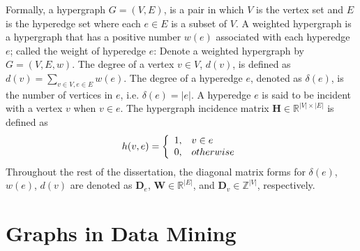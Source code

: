 Formally, a hypergraph $G = (V,E)$, is a pair in which $V$ is the vertex set and $E$ is the hyperedge set where each $e \in E$ is a subset of $V$. A weighted hypergraph is a hypergraph that has a positive number $w(e)$ associated with each hyperedge $e$; called the weight of hyperedge $e$: Denote a weighted hypergraph by $G = (V,E,w)$. The degree of a vertex $v \in V$, $d(v)$, is defined as $d(v) = \sum_{v\in V, e\in E}{w(e)}$. The degree of a hyperedge $e$, denoted as $\delta(e)$, is the number of vertices in $e$, i.e. $\delta(e)=|e|$. A hyperedge $e$ is said to be incident with a vertex $v$ when $v \in e$. The hypergraph incidence matrix $\mathbf{H} \in \mathbb{R}^{|V| \times |E|}$ is defined as
\begin{equation}
\notag h(v,e)=\left\{\begin{array}{cl}
	   1, & v \in e \\
	   0, & otherwise
	   \end{array}\right.
\end{equation}
Throughout the rest of the dissertation, the diagonal matrix forms for $\delta(e)$, $w(e)$, $d(v)$ are denoted as $\mathbf{D}_e$, $\mathbf{W} \in \mathbb{R}^{|E|}$, and $\mathbf{D}_v \in \mathbb{Z}^{|V|}$, respectively.

\section{Graphs in Data Mining}
